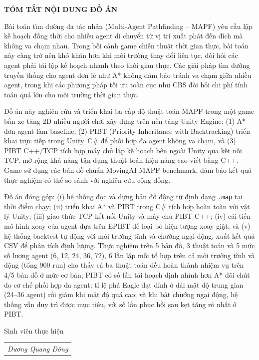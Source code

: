 \documentclass[../DoAn.tex]{subfiles}
\begin{document}
\begin{center}
    \Large{\textbf{TÓM TẮT NỘI DUNG ĐỒ ÁN}}\\
\end{center}
\vspace{1cm}

Bài toán tìm đường đa tác nhân (Multi-Agent Pathfinding -- MAPF) yêu cầu lập kế hoạch
đồng thời cho nhiều agent di chuyển từ vị trí xuất phát đến đích mà không va chạm nhau.
Trong bối cảnh game chiến thuật thời gian thực, bài toán này càng trở nên khó khăn hơn
khi môi trường thay đổi liên tục, đòi hỏi các agent phải tái lập kế hoạch nhanh theo
thời gian thực. Các giải pháp tìm đường truyền thống cho agent đơn lẻ
như A* không đảm bảo tránh va chạm giữa nhiều agent, trong khi các phương pháp tối ưu
toàn cục như CBS đòi hỏi chi phí tính toán quá lớn cho môi trường thời gian thực.

Đồ án này nghiên cứu và triển khai ba cấp độ thuật toán MAPF trong một game bắn xe tăng
2D nhiều người chơi xây dựng trên nền tảng Unity Engine: (1) A* đơn agent làm baseline,
(2) PIBT (Priority Inheritance with Backtracking) triển khai trực tiếp trong Unity~C\# để
phối hợp đa agent không va chạm, và (3) PIBT C++/TCP tích hợp máy chủ lập kế hoạch
bên ngoài Unity qua kết nối TCP, mở rộng khả năng tận dụng thuật toán hiệu năng cao
viết bằng C++. Game sử dụng các bản đồ chuẩn MovingAI MAPF benchmark, đảm bảo kết quả
thực nghiệm có thể so sánh với nghiên cứu cộng đồng.

Đồ án đóng góp: (i) hệ thống đọc và dựng bản đồ động từ định dạng \texttt{.map} tại
thời điểm chạy; (ii) triển khai A* và PIBT trong C\# tích hợp hoàn toàn với vật lý
Unity; (iii) giao thức TCP kết nối Unity và máy chủ PIBT C++; (iv) cải tiến mô hình xoay
của agent dựa trên EPIBT để loại bỏ hiện tượng xoay giật; và (v) hệ thống backtest tự động
với môi trường tĩnh và chướng ngại động, xuất kết quả CSV để phân tích định lượng. Thực
nghiệm trên 5 bản đồ, 3 thuật toán và 5 mức số lượng agent (6, 12, 24, 36, 72), 6 lần lặp
mỗi tổ hợp trên cả môi trường tĩnh và động (tổng 900 run) cho thấy cả ba thuật toán đều hoàn
thành nhiệm vụ trên 4/5 bản đồ ở mức cơ bản; PIBT có số lần tái hoạch định nhỉnh hơn A* đôi chút
do cơ chế phối hợp đa agent; tỉ lệ phá Eagle đạt đỉnh ở dải mật độ trung gian (24--36 agent) rồi
giảm khi mật độ quá cao; và khi bật chướng ngại động, hệ thống vẫn duy trì được mục tiêu, với số
lần phục hồi sau kẹt tăng rõ nhất ở PIBT.

\begin{flushright}
Sinh viên thực hiện\\
\begin{tabular}{@{}c@{}}
\textit{Dương Quang Đông}
\end{tabular}
\end{flushright}
\end{document}
